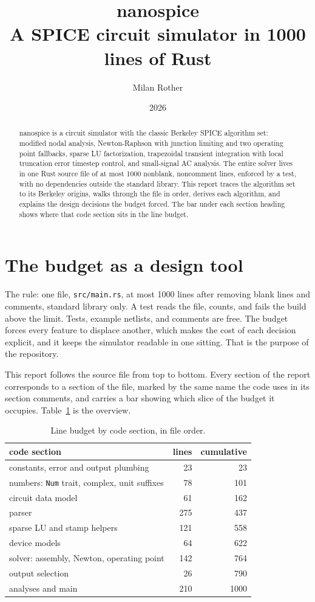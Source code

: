 \documentclass[11pt]{article}
\title{\textbf{nanospice}\\[4pt]\large A SPICE circuit simulator in 1000 lines of Rust}
\author{Milan Rother}
\date{2026}
\begin{document}
\maketitle

\begin{abstract}
\noindent
nanospice is a circuit simulator with the classic Berkeley SPICE algorithm
set: modified nodal analysis, Newton-Raphson with junction limiting and two
operating point fallbacks, sparse LU factorization, trapezoidal transient
integration with local truncation error timestep control, and small-signal
AC analysis. The entire solver lives in one Rust source file of at most
1000 nonblank, noncomment lines, enforced by a test, with no dependencies
outside the standard library. This report traces the algorithm set to its
Berkeley origins, walks through the file in order, derives each
algorithm, and explains the design decisions the budget forced. The bar under each section heading shows where that code section
sits in the line budget.
\end{abstract}

\section{The budget as a design tool}

The rule: one file, \texttt{src/main.rs}, at most 1000 lines after removing
blank lines and comments, standard library only. A test reads the file,
counts, and fails the build above the limit. Tests, example netlists, and
comments are free. The budget forces every feature to displace another,
which makes the cost of each decision explicit, and it keeps the simulator
readable in one sitting. That is the purpose of the repository.

This report follows the source file from top to bottom. Every section of
the report corresponds to a section of the file, marked by the same name
the code uses in its section comments, and carries a bar showing which
slice of the budget it occupies. Table~\ref{tab:budget} is the overview.

\begin{table}[h]
\centering
\begin{tabular}{lrr}
\toprule
code section & lines & cumulative \\
\midrule
constants, error and output plumbing & 23 & 23 \\
numbers: \texttt{Num} trait, complex, unit suffixes & 78 & 101 \\
circuit data model & 61 & 162 \\
parser & 275 & 437 \\
sparse LU and stamp helpers & 121 & 558 \\
device models & 64 & 622 \\
solver: assembly, Newton, operating point & 142 & 764 \\
output selection & 26 & 790 \\
analyses and main & 210 & 1000 \\
\bottomrule
\end{tabular}
\caption{Line budget by code section, in file order.}
\label{tab:budget}
\end{table}
\end{document}
